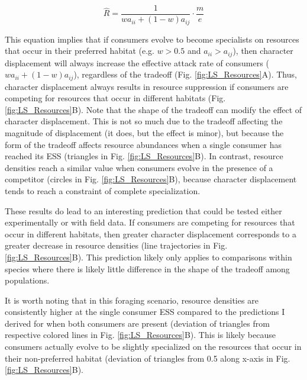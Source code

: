\documentclass[11pt,]{article}
\begin{document}
\[\hat{R}=\frac{1}{wa_{ii}+(1-w)a_{ij}}\cdot\frac{m}{e}\]

This equation implies that if consumers evolve to become specialists on
resources that occur in their preferred habitat (e.g. \(w>0.5\) and
\(a_{ii}>a_{ij}\)), then character displacement will always increase the
effective attack rate of consumers (\(wa_{ii}+(1-w)a_{ij}\)), regardless
of the tradeoff (Fig. \ref{fig:LS_Resources}A). Thus, character
displacement always results in resource suppression if consumers are
competing for resources that occur in different habitats (Fig.
\ref{fig:LS_Resources}B). Note that the shape of the tradeoff can modify
the effect of character displacement. This is not so much due to the
tradeoff affecting the magnitude of displacement (it does, but the
effect is minor), but because the form of the tradeoff affects resource
abundances when a single consumer has reached its ESS (triangles in Fig.
\ref{fig:LS_Resources}B). In contrast, resource densities reach a
similar value when consumers evolve in the presence of a competitor
(circles in Fig. \ref{fig:LS_Resources}B), because character
displacement tends to reach a constraint of complete specialization.

These results do lead to an interesting prediction that could be tested
either experimentally or with field data. If consumers are competing for
resources that occur in different habitats, then greater character
displacement corresponds to a greater decrease in resource densities
(line trajectories in Fig. \ref{fig:LS_Resources}B). This prediction
likely only applies to comparisons within species where there is likely
little difference in the shape of the tradeoff among populations.

It is worth noting that in this foraging scenario, resource densities
are consistently higher at the single consumer ESS compared to the
predictions I derived for when both consumers are present (deviation of
triangles from respective colored lines in Fig.
\ref{fig:LS_Resources}B). This is likely because consumers actually
evolve to be slightly specialized on the resources that occur in their
non-preferred habitat (deviation of triangles from 0.5 along x-axis in
Fig. \ref{fig:LS_Resources}B).
\end{document}

